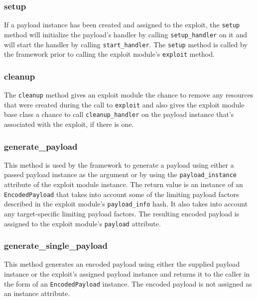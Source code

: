\documentclass{report}
\begin{document}
            \subsubsection{setup}

\par
If a payload instance has been created and assigned to the exploit,
the \texttt{setup} method will initialize the payload's handler by
calling \texttt{setup\_handler} on it and will start the handler by
calling \texttt{start\_handler}.  The \texttt{setup} method is
called by the framework prior to calling the exploit module's
\texttt{exploit} method.

            \subsubsection{cleanup}

\par
The \texttt{cleanup} method gives an exploit module the chance to
remove any resources that were created during the call to
\texttt{exploit} and also gives the exploit module base class a
chance to call \texttt{cleanup\_handler} on the payload instance
that's associated with the exploit, if there is one.

            \subsubsection{generate\_payload}

\par
This method is used by the framework to generate a payload using
either a passed payload instance as the argument or by using the
\texttt{payload\_instance} attribute of the exploit module instance.
The return value is an instance of an \texttt{EncodedPayload} that
takes into account some of the limiting payload factors described in
the exploit module's \texttt{payload\_info} hash.  It also takes
into account any target-specific limiting payload factors.  The
resulting encoded payload is assigned to the exploit module's
\texttt{payload} attribute.

            \subsubsection{generate\_single\_payload}

\par
This method generates an encoded payload using either the supplied
payload instance or the exploit's assigned payload instance and
returns it to the caller in the form of an \texttt{EncodedPayload}
instance. The encoded payload is not assigned as an instance
attribute.
\end{document}
